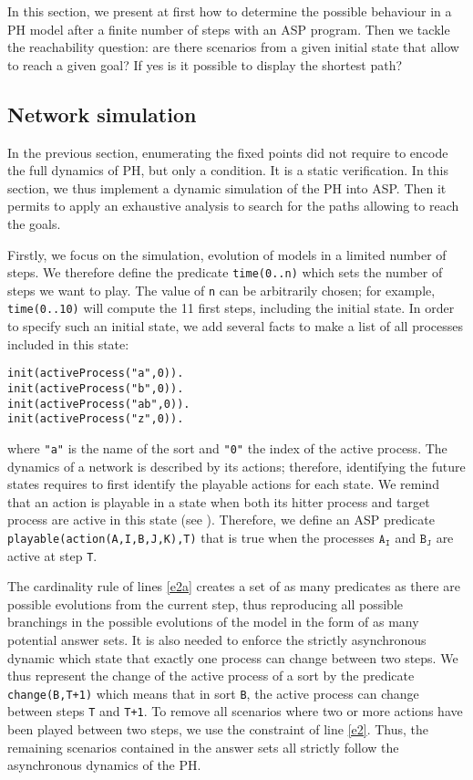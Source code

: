 
In this section, we present at first how to determine the possible behaviour in a PH model after a finite number of steps with an ASP program.
Then we tackle the reachability question: are there scenarios from a given initial state
that allow to reach a given goal? If yes is it possible to display the shortest path?

\subsection{Network simulation}
In the previous section, enumerating the fixed points did not require to
encode the full dynamics of PH, but only a condition. It is a static verification.
In this section, we thus implement a dynamic simulation of the PH into ASP. Then it permits to apply an exhaustive analysis to search for the paths allowing to reach the goals.

Firstly, we focus on the simulation, evolution of models in a limited number of steps.
We therefore define the predicate \texttt{time(0..n)} which sets the number of steps we want to play.
The value of \texttt{n} can be arbitrarily chosen;
for example, \texttt{time(0..10)} will compute the 11 first steps,
including the initial state.
In order to specify such an initial state, we add several facts
to make a list of all processes included in this state:
\begin{lstlisting}
init(activeProcess("a",0)). 
init(activeProcess("b",0)).
init(activeProcess("ab",0)).
init(activeProcess("z",0)).
\end{lstlisting}
where \texttt{"a"} is the name of the sort and \texttt{"0"} the index of the active process.
The dynamics of a network is described by its actions;
therefore, identifying the future states requires to first identify the playable actions for each state.
We remind that an action is playable in a state when both its hitter process and target process are active in this state (see ).
Therefore, we define an ASP predicate \texttt{playable(action(A,I,B,J,K),T)} that is true
when the processes $\texttt{A}_\texttt{I}$ and $\texttt{B}_\texttt{J}$ are active at step \texttt{T}.

The cardinality rule of lines \ref{e2a}
creates a set of as many predicates as there are possible evolutions from the current step,
thus reproducing all possible branchings in the possible evolutions of the model in the form of as many potential answer sets. It is also needed to enforce the strictly asynchronous dynamic
which state that exactly one process can change between two steps.
We thus represent the change of the active process of a sort
by the predicate \texttt{change(B,T+1)}
which means that in sort \texttt{B}, the active process can change between steps \texttt{T} and \texttt{T+1}.
To remove all scenarios where two or more actions have been played between
two steps, we use the constraint of line \ref{e2}.
Thus, the remaining scenarios contained in the answer sets all strictly follow
the asynchronous dynamics of the PH.

